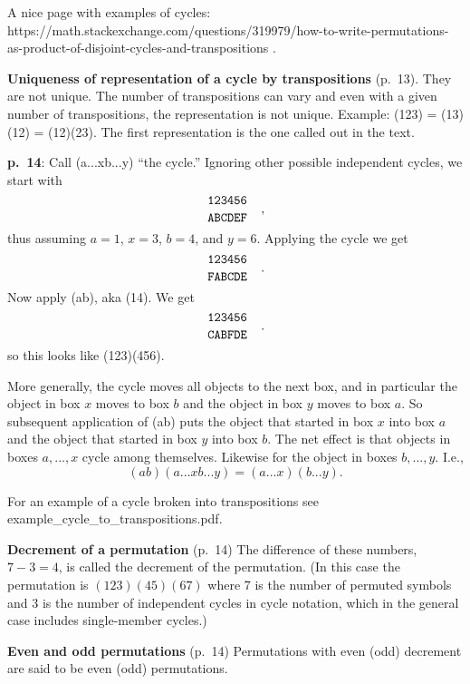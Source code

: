 A nice page with examples of cycles:
https://math.stackexchange.com/questions/319979/how-to-write-permutations-as-product-of-disjoint-cycles-and-transpositions
.

{\bf Uniqueness of representation of a cycle by transpositions}
(p.\ 13). They are not unique. The number of transpositions can vary
and even with a given number of transpositions, the representation is
not unique. Example: (123) = (13)(12) = (12)(23). The first
representation is the one called out in the text.

{\bf p.\ 14}: Call (a...xb...y) ``the cycle.'' Ignoring other possible
independent cycles, we start with
$$
\genfrac{}{}{0pt}0{\tt 123456}{\tt ABCDEF}\quad,
$$
thus assuming $a=1$, $x=3$, $b=4$, and $y=6$. Applying the cycle we get
$$
\genfrac{}{}{0pt}0{\tt 123456}{\tt FABCDE}\quad.
$$
Now apply (ab), aka (14). We get
$$
\genfrac{}{}{0pt}0{\tt 123456}{\tt CABFDE}\quad.
$$
so this looks like (123)(456).

More generally, the cycle moves all objects to the next box, and in
particular the object in box $x$ moves to box $b$ and the object in
box $y$ moves to box $a$. So subsequent application of (ab) puts the
object that started in box $x$ into box $a$ and the object that
started in box $y$ into box $b$. The net effect is that objects in
boxes $a,...,x$ cycle among themselves. Likewise for the object in
boxes $b,...,y$. I.e.,
$$
(ab)(a...xb...y) = (a...x)(b...y).
$$

For an example of a cycle broken into transpositions see
example\_cycle\_to\_transpositions.pdf.

{\bf Decrement of a permutation} (p.\ 14) The difference of these
numbers, $7-3 = 4$, is called the decrement of the permutation. (In
this case the permutation is $(123)(45)(67)$ where 7 is the number of
permuted symbols and 3 is the number of independent cycles in cycle
notation, which in the general case includes single-member cycles.)

{\bf Even and odd permutations} (p.\ 14) Permutations with even (odd)
decrement are said to be even (odd) permutations.

